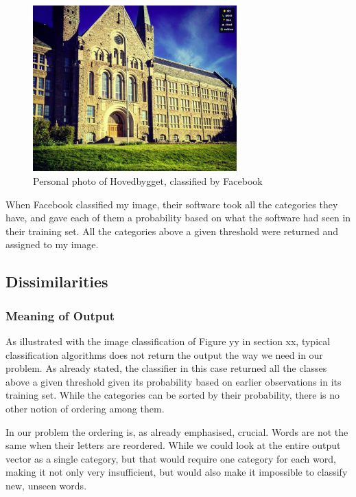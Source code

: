 \begin{figure}[H]
    \centering
    \includegraphics[width=0.7\textwidth]{fig/chapter4/facebook_classification_example.jpg}
    \caption{Personal photo of Hovedbygget, classified by Facebook}
    \label{fig:facebook-classification-example}
\end{figure}

When Facebook classified my image, their software took all the categories they have, and gave each of them a probability based on what the software had seen in their training set. All the categories above a given threshold were returned and assigned to my image. 

\subsection{Dissimilarities}

\subsubsection{Meaning of Output}
As illustrated with the image classification of Figure yy in section xx, typical classification algorithms does not return the output the way we need in our problem. As already stated, the classifier in this case returned all the classes above a given threshold given its probability based on earlier observations in its training set. While the categories can be sorted by their probability, there is no other notion of ordering among them.

In our problem the ordering is, as already emphasised, crucial. Words are not the same when their letters are reordered. While we could look at the entire output vector as a single category, but that would require one category for each word, making it not only very insufficient, but would also make it impossible to classify new, unseen words.

